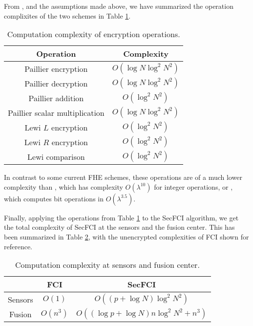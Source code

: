 \documentclass[letterpaper, 10 pt, conference]{ieeeconf}  %
\begin{document}
From \cite{paillierPublicKeyCryptosystemsBased1999,lewiOrderRevealingEncryptionNew2016}, and the assumptions made above, we have summarized the operation complixites of the two schemes in Table \ref{tab:complex_ops}.
\begin{table}[tb]
   \centering
   \caption{Computation complexity of encryption operations.}
   \label{tab:complex_ops}
   \begin{tabular}{ |c|c| }
      \hline
      \textbf{Operation} & \textbf{Complexity} \\ 
      \hline
      Paillier encryption & $O(\log{N}\log^2{N^2})$ \\ 
      Paillier decryption & $O(\log{N}\log^2{N^2})$ \\ 
      Paillier addition & $O(\log^2{N^2})$ \\ 
      Paillier scalar multiplication & $O(\log{N}\log^2{N^2})$ \\ 
      Lewi $L$ encryption & $O(\log^2{N^2})$ \\ 
      Lewi $R$ encryption & $O(\log^2{N^2})$ \\ 
      Lewi comparison & $O(\log^2{N^2})$ \\ 
      \hline
   \end{tabular}
\end{table}
In contrast to some current FHE schemes, these operations are of a much lower complexity than \cite{vandijkFullyHomomorphicEncryption2010a}, which has complexity $O(\lambda^{10})$ for integer operations, or \cite{stehleFasterFullyHomomorphic2010}, which computes bit operations in $O(\lambda^{3.5})$.

Finally, applying the operations from Table \ref{tab:complex_ops} to the SecFCI algorithm, we get the total complexity of SecFCI at the sensors and the fusion center. This has been summarized in Table \ref{tab:complex}, with the unencrypted complexities of FCI shown for reference. 
\begin{table}[tb]
   \centering
   \caption{Computation complexity at sensors and fusion center.}
   \label{tab:complex}
   \begin{tabular}{ |c|c|c| }
      \hline
       & \textbf{FCI} & \textbf{SecFCI} \\ 
      \hline
      Sensors & $O(1)$ & $O\left((p + \log{N})\log^2{N^2}\right)$ \\ 
      Fusion & $O(n^3)$ & $O\left((\log{p} + \log{N})n\log^2{N^2} + n^3\right)$ \\ 
      \hline
   \end{tabular}
\end{table}
\end{document}
